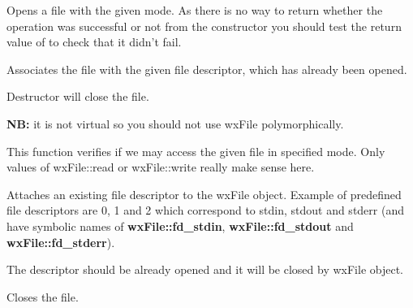 Opens a file with the given mode. As there is no way to return whether the
operation was successful or not from the constructor you should test the
return value of  to check that it didn't
fail.


Associates the file with the given file descriptor, which has already been opened.






\label{wxfiledtor}


Destructor will close the file.

{\bf NB:} it is not virtual so you should not use wxFile polymorphically.


\label{wxfileaccess}


This function verifies if we may access the given file in specified mode. Only
values of wxFile::read or wxFile::write really make sense here.


\label{wxfileattach}


Attaches an existing file descriptor to the wxFile object. Example of predefined
file descriptors are 0, 1 and 2 which correspond to stdin, stdout and stderr (and
have symbolic names of {\bf wxFile::fd\_stdin}, {\bf wxFile::fd\_stdout} and {\bf wxFile::fd\_stderr}).

The descriptor should be already opened and it will be closed by wxFile
object.


\label{wxfileclose}


Closes the file.


\label{wxfilecreate}

